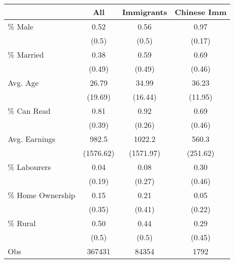 \begin{tabular}{lccc}
  \hline
 & All & Immigrants & Chinese Imm \\ 
  \hline
\% Male & 0.52 & 0.56 & 0.97 \\ 
   & (0.5) & (0.5) & (0.17) \\ 
  \% Married & 0.38 & 0.59 & 0.69 \\ 
    & (0.49) & (0.49) & (0.46) \\ 
  Avg. Age & 26.79 & 34.99 & 36.23 \\ 
     & (19.69) & (16.44) & (11.95) \\ 
  \% Can Read & 0.81 & 0.92 & 0.69 \\ 
      & (0.39) & (0.26) & (0.46) \\ 
  Avg. Earnings &  982.5 & 1022.2 &  560.3 \\ 
       & (1576.62) & (1571.97) & (251.62) \\ 
  \% Labourers & 0.04 & 0.08 & 0.30 \\ 
        & (0.19) & (0.27) & (0.46) \\ 
  \% Home Ownership & 0.15 & 0.21 & 0.05 \\ 
         & (0.35) & (0.41) & (0.22) \\ 
  \% Rural & 0.50 & 0.44 & 0.29 \\ 
          & (0.5) & (0.5) & (0.45) \\ 
   \hline
Obs & 367431 &  84354 &   1792 \\ 
   \hline
\end{tabular}
